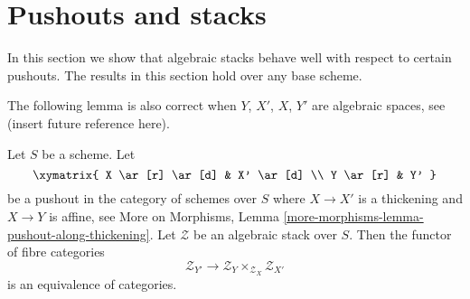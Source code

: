 \section{Pushouts and stacks}
\label{section-pushouts}

\noindent
In this section we show that algebraic stacks behave well with
respect to certain pushouts. The results in this section hold over
any base scheme.

\medskip\noindent
The following lemma is also correct when $Y$, $X'$, $X$, $Y'$ are
algebraic spaces, see (insert future reference here).

\begin{lemma}
\label{lemma-pushout}
Let $S$ be a scheme. Let
$$
\xymatrix{
X \ar[r] \ar[d] & X' \ar[d] \\
Y \ar[r] & Y'
}
$$
be a pushout in the category of schemes over $S$ where $X \to X'$
is a thickening and $X \to Y$ is affine, see
More on Morphisms, Lemma \ref{more-morphisms-lemma-pushout-along-thickening}.
Let $\mathcal{Z}$ be an algebraic stack over $S$.
Then the functor of fibre categories
$$
\mathcal{Z}_{Y'}
\longrightarrow
\mathcal{Z}_Y \times_{\mathcal{Z}_X} \mathcal{Z}_{X'}
$$
is an equivalence of categories.
\end{lemma}

